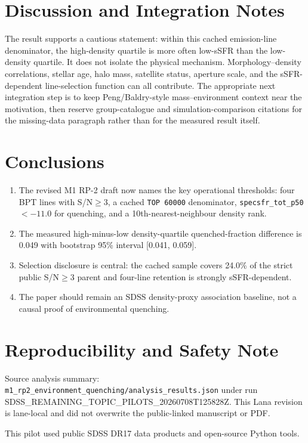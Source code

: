 \documentclass[twocolumn]{aastex631}
\begin{document}
\section{Discussion and Integration Notes}\label{sec:discussion}
The result supports a cautious statement: within this cached emission-line denominator, the high-density quartile is more often low-sSFR than the low-density quartile.  It does not isolate the physical mechanism.  Morphology--density correlations, stellar age, halo mass, satellite status, aperture scale, and the sSFR-dependent line-selection function can all contribute.  The appropriate next integration step is to keep Peng/Baldry-style mass--environment context near the motivation, then reserve group-catalogue and simulation-comparison citations for the missing-data paragraph rather than for the measured result itself.

\section{Conclusions}\label{sec:conclusions}
\begin{enumerate}
\item The revised M1 RP-2 draft now names the key operational thresholds: four BPT lines with S/N$\geq3$, a cached \texttt{TOP 60000} denominator, \texttt{specsfr\_tot\_p50}$<-11.0$ for quenching, and a 10th-nearest-neighbour density rank.
\item The measured high-minus-low density-quartile quenched-fraction difference is 0.049 with bootstrap 95\% interval [0.041, 0.059].
\item Selection disclosure is central: the cached sample covers 24.0\% of the strict public S/N$\geq3$ parent and four-line retention is strongly sSFR-dependent.
\item The paper should remain an SDSS density-proxy association baseline, not a causal proof of environmental quenching.
\end{enumerate}

\section*{Reproducibility and Safety Note}
Source analysis summary: \texttt{m1\_rp2\_environment\_quenching/analysis\_results.json} under run SDSS\_REMAINING\_TOPIC\_PILOTS\_20260708T125828Z.  This Lana revision is lane-local and did not overwrite the public-linked manuscript or PDF.

\acknowledgments
This pilot used public SDSS DR17 data products and open-source Python tools.
\end{document}
